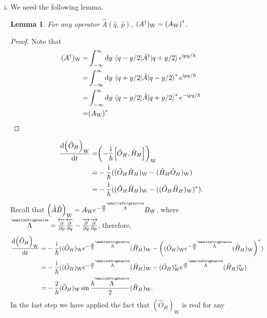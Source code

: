 \documentclass{article}
\newtheorem{lemma}[theorem]{Lemma}
\newcommand{\iu}{\ensuremath{\mathrm{i}}}
\newcommand{\tensor}[1]{\overset{\scriptscriptstyle\smallleftrightarrow}{#1}}
\begin{document}
\begin{enumerate}[1.]
\begin{enumerate}[(i)]
    \item We need the following lemma.
    \begin{lemma}
      For any operator $\hat{A}(\hat{q},\ \hat{p})$, $(A^\dagger)_\mathrm{W} = \qty({A_\mathrm{W}})^*$.
    \end{lemma}
    \begin{proof}
      Note that
      \begin{align*}
        (A^\dagger)_\mathrm{W} =& \int_{-\infty}^{\infty}\dd{y}\mel{q-y/2}{\hat{A}^{\dagger}}{q + y/2} e^{\iu p y / \hbar}
        \\
        =& \int_{-\infty}^{\infty}\dd{y}\mel{q+y/2}{\hat{A}}{q - y/2}^* e^{\iu p y / \hbar}\\
        =& \int_{-\infty}^{\infty}\dd{y}\mel{q-y/2}{\hat{A}}{q + y/2}^* e^{-\iu p y / \hbar}\\
        =& \qty({A_\mathrm{W}})^*
      \end{align*}
    \end{proof}
    \begin{align*}
      \dv{\qty(\hat{O}_H)_\mathrm{W}}{t} =& \qty(-\frac{\iu}{\hbar}\comm{\hat{O}_H}{\hat{H}_H})_\mathrm{W}\\
      =& -\frac{\iu}{\hbar}((\hat{O}_H\hat{H}_H)_\mathrm{W}-(\hat{H}_H\hat{O}_H)_\mathrm{W})\\
      =& -\frac{\iu}{\hbar}((\hat{O}_H\hat{H}_H)_\mathrm{W}-((\hat{O}_H\hat{H}_H)_\mathrm{W})^*).
    \end{align*}
    Recall that $\qty(\hat{A}\hat{B})_\mathrm{W} = A_\mathrm{W} e^{-\frac{\iu\hbar}{2}\tensor{\Lambda}}B_\mathrm{W}$, where $\tensor{\Lambda} = \overleftarrow{\pdv{p}}\overleftarrow{\pdv{q}} - \overrightarrow{\pdv{q}}\overrightarrow{\pdv{p}}$, therefore,
    \begin{align*}
      \dv{\qty(\hat{O}_H)_\mathrm{W}}{t} 
      =& -\frac{\iu}{\hbar}((\hat{O}_H)_\mathrm{W} e^{-\frac{\iu\hbar}{2}\tensor{\Lambda}} (\hat{H}_H)_\mathrm{W} - \qty((\hat{O}_H)_\mathrm{W} e^{-\frac{\iu\hbar}{2}\tensor{\Lambda}} (\hat{H}_H)_\mathrm{W})^*) \\
      =& -\frac{\iu}{\hbar}((\hat{O}_H)_\mathrm{W} e^{-\frac{\iu\hbar}{2}\tensor{\Lambda}} (\hat{H}_H)_\mathrm{W} - (\hat{O}_H)_\mathrm{W}^* e^{\frac{\iu\hbar}{2}\tensor{\Lambda}} (\hat{H}_H)_\mathrm{W}^*)\\
      =& -\frac{2}{\hbar}(\hat{O}_H)_\mathrm{W} \sin{\frac{\hbar\tensor{\Lambda}}{2}} (\hat{H}_H)_\mathrm{W}.
    \end{align*}
    In the last step we have applied the fact that $(\hat{O}_H)_\mathrm{W}$ is real for any

\end{enumerate}
\end{enumerate}
\end{document}
